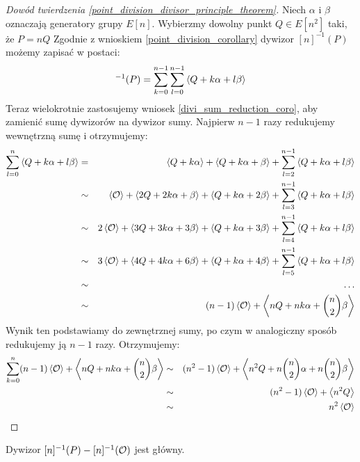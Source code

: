 \begin{proof}[Dowód twierdzenia \ref{point_division_divisor_principle_theorem}]
Niech $\alpha$ i $\beta$ oznaczają generatory grupy $E[n]$.
Wybierzmy dowolny punkt $Q \in E[n^2]$ taki, że $P = nQ$
Zgodnie z wnioskiem \ref{point_division_corollary}
dywizor $[n]^{-1}(P)$ możemy zapisać w postaci:
\begin{equation*}
[n]^{-1}(P) = \sum_{k=0}^{n-1} \sum_{l=0}^{n-1} \divi{Q + k\alpha + l\beta}
\end{equation*}
Teraz wielokrotnie zastosujemy wniosek \ref{divi_sum_reduction_coro},
aby zamienić sumę dywizorów na dywizor sumy.
Najpierw $n-1$ razy redukujemy wewnętrzną sumę i otrzymujemy:
\begin{eqnarray*}
\sum_{l=0}^n \left\langle Q + k\alpha + l\beta\right\rangle
& =    & \left\langle Q + k\alpha\right\rangle + \left\langle Q + k\alpha + \beta\right\rangle +
         \sum_{l=2}^{n-1} \left\langle Q + k\alpha + l\beta\right\rangle \\
& \sim & \left\langle\mathcal{O}\right\rangle + \left\langle2Q + 2k\alpha + \beta\right\rangle +
         \left\langle Q + k\alpha + 2\beta\right\rangle +
         \sum_{l=3}^{n-1} \left\langle Q + k\alpha + l\beta\right\rangle \\
& \sim & 2\left\langle\mathcal{O}\right\rangle + \left\langle3Q + 3k\alpha + 3\beta\right\rangle +
         \left\langle Q + k\alpha + 3\beta\right\rangle +
         \sum_{l=4}^{n-1} \left\langle Q + k\alpha + l\beta\right\rangle \\
& \sim & 3\left\langle\mathcal{O}\right\rangle + \left\langle4Q + 4k\alpha + 6\beta\right\rangle +
         \left\langle Q + k\alpha + 4\beta\right\rangle +
         \sum_{l=5}^{n-1} \left\langle Q + k\alpha + l\beta\right\rangle \\
& \sim & \ldots \\
& \sim & (n-1)\left\langle\mathcal{O}\right\rangle + \left\langle nQ + nk\alpha + \binom{n}{2}\beta\right\rangle
\end{eqnarray*}
Wynik ten podstawiamy do zewnętrznej sumy,
po czym w analogiczny sposób redukujemy ją $n-1$ razy.
Otrzymujemy:
\begin{eqnarray*}
\sum_{k=0}^n (n-1)\left\langle\mathcal{O}\right\rangle +
             \left\langle nQ + nk\alpha + \binom{n}{2}\beta\right\rangle
& \sim & (n^2-1)\left\langle\mathcal{O}\right\rangle +
         \left\langle n^2Q + n\binom{n}{2}\alpha + n\binom{n}{2}\beta\right\rangle \\
& \sim & (n^2-1)\left\langle\mathcal{O}\right\rangle + \left\langle n^2Q\right\rangle \\
& \sim & n^2\left\langle\mathcal{O}\right\rangle
\end{eqnarray*}
\end{proof}

\begin{corollary}
Dywizor $[n]^{-1}(P) - [n]^{-1}(\mathcal{O})$ jest główny.
\end{corollary}

